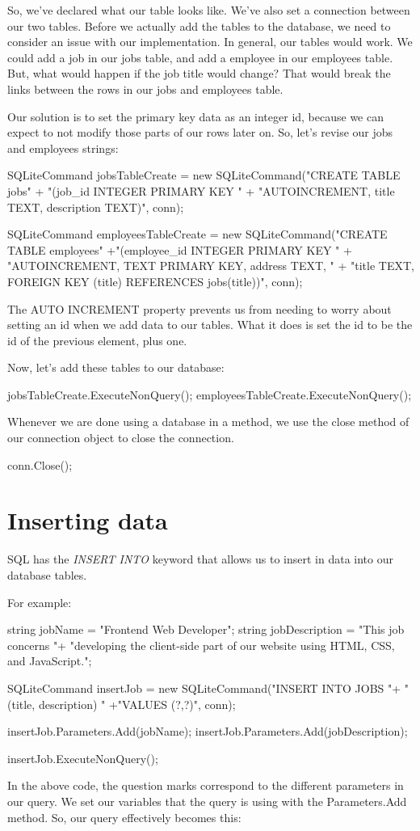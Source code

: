 \documentclass[oneside, openany] {book}
\begin{document}
So, we've declared what our table looks like. We've also set a connection between our two tables. Before we actually add the tables to the database, we need to consider an issue with our implementation. In general, our tables would work. We could add a job in our jobs table, and add a employee in our employees table. But, what would happen if the job title would change? That would break the links between the rows in our jobs and employees table.

Our solution is to set the primary key data as an integer id, because we can expect to not modify those parts of our rows later on. So, let's revise our jobs and employees strings:
\begin{CSharp}

SQLiteCommand jobsTableCreate = new SQLiteCommand("CREATE TABLE jobs" + 
"(job_id INTEGER PRIMARY KEY " + 
"AUTOINCREMENT, title TEXT, description TEXT)", conn);

SQLiteCommand employeesTableCreate = new SQLiteCommand("CREATE TABLE employees" 
+"(employee_id INTEGER PRIMARY KEY " +
"AUTOINCREMENT, TEXT PRIMARY KEY, address TEXT, "
+ "title TEXT, FOREIGN KEY (title) REFERENCES jobs(title))", conn);
\end{CSharp}

The AUTO INCREMENT property prevents us from needing to worry about setting an id when we add data to our tables. What it does is set the id to be the id of the previous element, plus one.

Now, let's add these tables to our database:
\begin{CSharp}
jobsTableCreate.ExecuteNonQuery();
employeesTableCreate.ExecuteNonQuery();
\end{CSharp}
Whenever we are done using a database in a method, we use the close method of our connection object to close the connection.

\begin{CSharp}
conn.Close();
\end{CSharp}
\section{Inserting data}
SQL has the \emph{INSERT INTO} keyword that allows us to insert in data into our database tables.

For example:
\begin{CSharp}

string jobName = "Frontend Web Developer";
string jobDescription = "This job concerns "+
"developing the client-side part of our website using HTML, CSS, and JavaScript.";
    
SQLiteCommand insertJob = new SQLiteCommand("INSERT INTO JOBS "+ "(title, description) "
+"VALUES (?,?)", conn);

insertJob.Parameters.Add(jobName);
insertJob.Parameters.Add(jobDescription);

insertJob.ExecuteNonQuery();
\end{CSharp}
In the above code, the question marks correspond to the different parameters in our query. We set our variables that the query is using with the Parameters.Add method. So, our query effectively becomes this:
\end{document}
